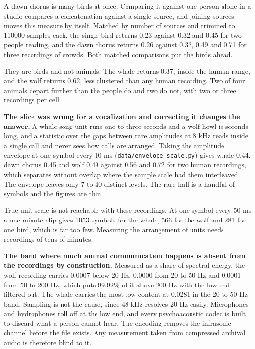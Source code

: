 A dawn chorus is many birds at once. Comparing it against one person alone in a studio compares a concatenation against a single source, and joining sources moves this measure by itself. Matched by number of sources and trimmed to 110000 samples each, the single bird returns 0.23 against 0.32 and 0.45 for two people reading, and the dawn chorus returns 0.26 against 0.33, 0.49 and 0.71 for three recordings of crowds. Both matched comparisons put the birds ahead.

They are birds and not animals. The whale returns 0.37, inside the human range, and the wolf returns 0.62, less clustered than any human recording. Two of four animals depart further than the people do and two do not, with two or three recordings per cell.

\textbf{The slice was wrong for a vocalization and correcting it changes the answer.} A whale song unit runs one to three seconds and a wolf howl is seconds long, and a statistic over the gaps between rare amplitudes at 8 kHz reads inside a single call and never sees how calls are arranged. Taking the amplitude envelope at one symbol every 10 ms (\texttt{data/\allowbreak{}envelope\_\allowbreak{}scale.\allowbreak{}py}) gives whale 0.44, dawn chorus 0.45 and wolf 0.49 against 0.56 and 0.72 for two human recordings, which separates without overlap where the sample scale had them interleaved. The envelope leaves only 7 to 40 distinct levels. The rare half is a handful of symbols and the figures are thin.

True unit scale is not reachable with these recordings. At one symbol every 50 ms a one minute clip gives 1053 symbols for the whale, 566 for the wolf and 281 for one bird, which is far too few. Measuring the arrangement of units needs recordings of tens of minutes.

\textbf{The band where much animal communication happens is absent from the recordings by construction.} Measured as a share of spectral energy, the wolf recording carries 0.0007 below 20 Hz, 0.0000 from 20 to 50 Hz and 0.0001 from 50 to 200 Hz, which puts 99.92\% of it above 200 Hz with the low end filtered out. The whale carries the most low content at 0.0281 in the 20 to 50 Hz band. Sampling is not the cause, since 48 kHz resolves 20 Hz easily. Microphones and hydrophones roll off at the low end, and every psychoacoustic codec is built to discard what a person cannot hear. The encoding removes the infrasonic channel before the file exists. Any measurement taken from compressed archival audio is therefore blind to it.


